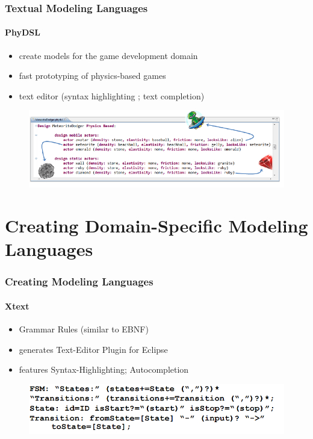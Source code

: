\documentclass[11 pt,t]{beamer}
\begin{document}
\begin{frame}
\vspace{.5cm}
  \frametitle{Textual Modeling Languages}
  \framesubtitle{PhyDSL}
  \begin{itemize}
   \item create models for the game development domain
   \item fast prototyping of physics-based games
   \item text editor (syntax highlighting ; text completion)
  \end{itemize}

  \begin{figure}[hbtp]
      \centering
      \includegraphics[width=\textwidth]{../images/PhyDSL1.PNG}
    \end{figure}
\end{frame}

\section{Creating Domain-Specific Modeling Languages}
\begin{frame}
\vspace{.5cm}
  \frametitle{Creating Modeling Languages}
  \framesubtitle{Xtext}
  \begin{itemize}
    \item Grammar Rules (similar to EBNF)
    \item generates Text-Editor Plugin for Eclipse
    \item features Syntax-Highlighting; Autocompletion
  \end{itemize}
  \begin{figure}[hbtp]
      \centering
      \includegraphics[width=\textwidth]{../images/XTextGrammar.PNG}
    \end{figure}
\end{frame}
\end{document}
